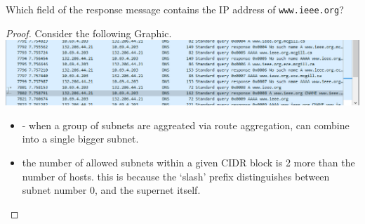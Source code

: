 \documentclass[../../main.tex]{subfiles}
\begin{document}
\begin{wts}
Which field of the response message contains the IP address of \lstinline{www.ieee.org}?
\end{wts}
\begin{proof}
    Consider the following Graphic.
    \includegraphics[width=\textwidth]{subfiles/images/308_Lab5_Part_1_PAGE0_0_Image20.png}
    \begin{itemize}
        \item - when a group of subnets are aggreated via route aggregation, can combine into a single bigger subnet.
        \item the number of allowed subnets within a given CIDR block is 2 more than the number of hosts. this is because the ‘slash’ prefix distinguishes between subnet number 0, and the supernet itself.
    \end{itemize}
\end{proof}
\end{document}

